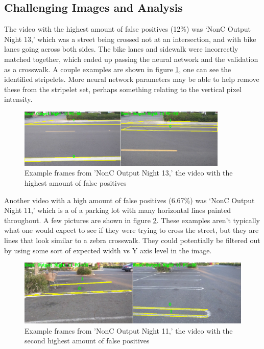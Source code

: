 \subsection{Challenging Images and Analysis}

The video with the highest amount of false positives (12\%) was `NonC Output Night 13,' which was a street being crossed not at an intersection, and with bike lanes going across both sides. The bike lanes and sidewalk were incorrectly matched together, which ended up passing the neural network and the validation as a crosswalk. A couple examples are shown in figure \ref{fig:worstFalsePosPic}, one can see the identified stripelets. More neural network parameters may be able to help remove these from the stripelet set, perhaps something relating to the vertical pixel intensity. 

\begin{figure}[t]
\begin{center}
\includegraphics[width=10cm]{figures/NonCWorstCwalk.png}
\captionfonts
\caption{Example frames from 'NonC Output Night 13,' the video with the highest amount of false positives}
\label{fig:worstFalsePosPic}
\end{center}
\end{figure}

Another video with a high amount of false positives (6.67\%) was `NonC Output Night 11,' which is a of a parking lot with many horizontal lines painted throughout.  A few pictures are shown in figure \ref{fig:2ndworstFalsePosPic}. These examples aren't typically what one would expect to see if they were trying to cross the street, but they are lines that look similar to a zebra crosswalk. They could potentially be filtered out by using some sort of expected width vs Y axis level in the image. 

\begin{figure}[t]
\begin{center}
\includegraphics[width=14cm]{figures/NonC2ndWorstCwalk.png}
\captionfonts
\caption{Example frames from 'NonC Output Night 11,' the video with the second highest amount of false positives}
\label{fig:2ndworstFalsePosPic}
\end{center}
\end{figure}

